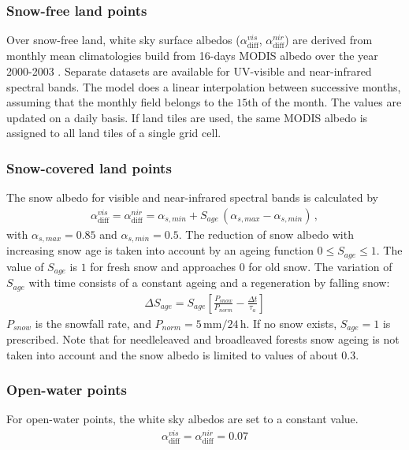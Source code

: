 \documentclass[a4paper,11pt]{article}
\begin{document}
\subsubsection{Snow-free land points}
Over snow-free land, white sky surface albedos ($\alpha_{\mathrm{diff}}^{vis}$, $\alpha_{\mathrm{diff}}^{nir}$) are derived from monthly mean climatologies build from 16-days MODIS 
albedo over the year 2000-2003 \citep{Schaaf:2002}. Separate datasets are available for UV-visible and near-infrared spectral bands. The model does a linear interpolation between 
successive months, assuming that the monthly field belongs to the $15\mathrm{th}$ of the month. The values are updated on a daily basis. If land tiles are used, the same MODIS albedo 
is assigned to all land tiles of a single grid cell.


\subsubsection{Snow-covered land points}
The snow albedo for visible and near-infrared spectral bands is calculated by
\begin{align}
 \alpha_{\mathrm{diff}}^{vis} = \alpha_{\mathrm{diff}}^{nir} =\alpha_{s,min} + S_{age}\,\left(\alpha_{s,max} - \alpha_{s,min}\right)\,,
\end{align}
with $\alpha_{s,max}=0.85$ and $\alpha_{s,min}=0.5$. The reduction of snow albedo with increasing snow age is taken into account by an ageing function $0\leq S_{age}\leq 1$. The value 
of $S_{age}$ is $1$ for fresh snow and approaches 0 for old snow. The variation of $S_{age}$ with time consists of a constant ageing and a regeneration by falling snow:
\begin{align}
 \Delta S_{age} = S_{age}\left[\frac{P_{snow}}{P_{norm}} - \frac{\Delta t}{\tau_{a}}\right]
\end{align}
$P_{snow}$ is the snowfall rate, and $P_{norm}=5\,\mathrm{mm}/24\,\mathrm{h}$. If no snow exists, $S_{age}=1$ is prescribed. Note that for needleleaved and broadleaved forests snow 
ageing is not taken into account and the snow albedo is limited to values of about $0.3$.


\subsubsection{Open-water points}
For open-water points, the white sky albedos are set to a constant value.
\begin{align}
  \alpha_{\mathrm{diff}}^{vis} = \alpha_{\mathrm{diff}}^{nir} = 0.07
\end{align}
\end{document}
